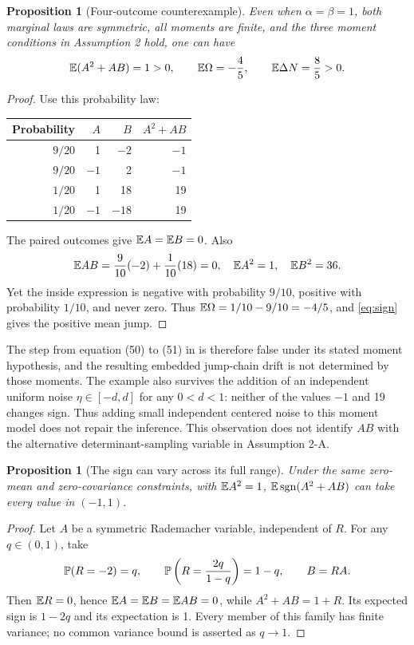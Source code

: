 \documentclass[11pt,a4paper]{article}
\newtheorem{proposition}[theorem]{Proposition}
\theoremstyle{remark}\newtheorem{remark}[theorem]{Remark}
\begin{document}
\begin{proposition}[Four-outcome counterexample]\label{prop:law}
Even when \(\alpha=\beta=1\), both marginal laws are symmetric, all moments are finite, and the three moment conditions in Assumption 2 hold, one can have
\[
 \mathbb E(A^2+AB)=1>0,\qquad \mathbb E\Omega=-\frac45,
 \qquad\mathbb E\Delta N=\frac85>0.
\]
\end{proposition}
\begin{proof}
Use this probability law:
\begin{center}
\begin{tabular}{rrrr}
\toprule
Probability & \(A\)&\(B\)&\(A^2+AB\)\\
\midrule
\(9/20\)&1&$-2$&$-1$\\
\(9/20\)&$-1$&2&$-1$\\
\(1/20\)&1&18&19\\
\(1/20\)&$-1$&$-18$&19\\
\bottomrule
\end{tabular}
\end{center}
The paired outcomes give \(\mathbb E A=\mathbb E B=0\). Also
\[
 \mathbb E AB=\frac9{10}(-2)+\frac1{10}(18)=0,
 \quad \mathbb E A^2=1,\quad \mathbb E B^2=36.
\]
Yet the inside expression is negative with probability \(9/10\), positive with probability \(1/10\), and never zero. Thus \(\mathbb E\Omega=1/10-9/10=-4/5\), and \eqref{eq:sign} gives the positive mean jump.
\end{proof}

The step from equation (50) to (51) in \citet{D15} is therefore false under its stated moment hypothesis, and the resulting embedded jump-chain drift is not determined by those moments. The example also survives the addition of an independent uniform noise \(\eta\in[-d,d]\) for any \(0<d<1\): neither of the values \(-1\) and 19 changes sign. Thus adding small independent centered noise to this moment model does not repair the inference. This observation does not identify \(AB\) with the alternative determinant-sampling variable in Assumption 2-A.

\begin{proposition}[The sign can vary across its full range]\label{prop:sharp}
Under the same zero-mean and zero-covariance constraints, with \(\mathbb E A^2=1\), \(\mathbb E\operatorname{sgn}(A^2+AB)\) can take every value in \((-1,1)\).
\end{proposition}
\begin{proof}
Let \(A\) be a symmetric Rademacher variable, independent of \(R\). For any \(q\in(0,1)\), take
\[
 \mathbb P(R=-2)=q,\qquad
 \mathbb P\left(R=\frac{2q}{1-q}\right)=1-q,
 \qquad B=RA.
\]
Then \(\mathbb E R=0\), hence \(\mathbb E A=\mathbb E B=\mathbb E AB=0\), while \(A^2+AB=1+R\). Its expected sign is \(1-2q\) and its expectation is 1. Every member of this family has finite variance; no common variance bound is asserted as \(q\to1\).
\end{proof}
\end{document}
